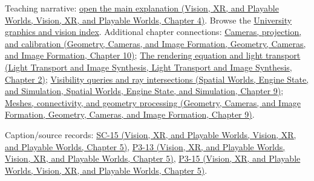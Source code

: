 Teaching narrative: \href{../07-Vision-XR-and-Playable-Worlds/main.pdf\#nameddest=04-visual-computing-ii-ch034-learned-representations-of-3d-shape-and-scenes}{open the main explanation (Vision, XR, and Playable Worlds, Vision, XR, and Playable Worlds, Chapter 4)}. Browse the \hyperref[appendix-a6d556a4ef50-university-graphics-vision-and-photography---independent-series]{University graphics and vision index}. Additional chapter connections: \href{../03-Geometry-Cameras-and-Image-Formation/main.pdf\#nameddest=03-visual-computing-i-ch003-cameras-projection-and-calibration}{Cameras, projection, and calibration (Geometry, Cameras, and Image Formation, Geometry, Cameras, and Image Formation, Chapter 10)}; \href{../04-Light-Transport-and-Image-Synthesis/main.pdf\#nameddest=03-visual-computing-i-ch007-the-rendering-equation-and-light-transport}{The rendering equation and light transport (Light Transport and Image Synthesis, Light Transport and Image Synthesis, Chapter 2)}; \href{../05-Spatial-Worlds-Engine-State-and-Simulation/main.pdf\#nameddest=04-visual-computing-ii-ch028-visibility-queries-and-ray-intersections-1}{Visibility queries and ray intersections (Spatial Worlds, Engine State, and Simulation, Spatial Worlds, Engine State, and Simulation, Chapter 9)}; \href{../03-Geometry-Cameras-and-Image-Formation/main.pdf\#nameddest=03-visual-computing-i-ch002-meshes-connectivity-and-geometry-processing}{Meshes, connectivity, and geometry processing (Geometry, Cameras, and Image Formation, Geometry, Cameras, and Image Formation, Chapter 9)}.

Caption/source records: \href{../07-Vision-XR-and-Playable-Worlds/main.pdf\#nameddest=04-visual-computing-ii-ch036-sc-15---stanford-cs231n-deep-learning-for-computer-vision-spring-2025-lecture-15-3d-vision}{SC-15 (Vision, XR, and Playable Worlds, Vision, XR, and Playable Worlds, Chapter 5)}, \href{../07-Vision-XR-and-Playable-Worlds/main.pdf\#nameddest=04-visual-computing-ii-ch036-p3-13---curves-and-surfaces}{P3-13 (Vision, XR, and Playable Worlds, Vision, XR, and Playable Worlds, Chapter 5)}, \href{../07-Vision-XR-and-Playable-Worlds/main.pdf\#nameddest=04-visual-computing-ii-ch036-p3-15---ray-tracing}{P3-15 (Vision, XR, and Playable Worlds, Vision, XR, and Playable Worlds, Chapter 5)}.
